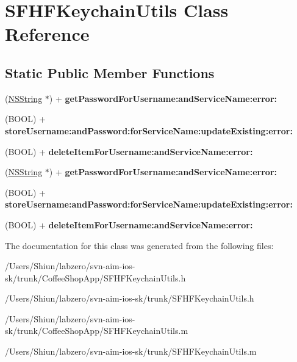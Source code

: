 \hypertarget{interface_s_f_h_f_keychain_utils}{
\section{SFHFKeychainUtils Class Reference}
\label{interface_s_f_h_f_keychain_utils}
}
\subsection*{Static Public Member Functions}
\begin{DoxyCompactItemize}
\item 
\hypertarget{interface_s_f_h_f_keychain_utils_a027d7dbf8da116cca940121559b57049}{
(\hyperlink{class_n_s_string}{NSString} $\ast$) + {\bfseries getPasswordForUsername:andServiceName:error:}}
\label{interface_s_f_h_f_keychain_utils_a027d7dbf8da116cca940121559b57049}

\item 
\hypertarget{interface_s_f_h_f_keychain_utils_afb7ef06a2b70b4f4c7db90728464a8d8}{
(BOOL) + {\bfseries storeUsername:andPassword:forServiceName:updateExisting:error:}}
\label{interface_s_f_h_f_keychain_utils_afb7ef06a2b70b4f4c7db90728464a8d8}

\item 
\hypertarget{interface_s_f_h_f_keychain_utils_aab8f59a643a261b8387f94a75cb8a616}{
(BOOL) + {\bfseries deleteItemForUsername:andServiceName:error:}}
\label{interface_s_f_h_f_keychain_utils_aab8f59a643a261b8387f94a75cb8a616}

\item 
\hypertarget{interface_s_f_h_f_keychain_utils_a027d7dbf8da116cca940121559b57049}{
(\hyperlink{class_n_s_string}{NSString} $\ast$) + {\bfseries getPasswordForUsername:andServiceName:error:}}
\label{interface_s_f_h_f_keychain_utils_a027d7dbf8da116cca940121559b57049}

\item 
\hypertarget{interface_s_f_h_f_keychain_utils_afb7ef06a2b70b4f4c7db90728464a8d8}{
(BOOL) + {\bfseries storeUsername:andPassword:forServiceName:updateExisting:error:}}
\label{interface_s_f_h_f_keychain_utils_afb7ef06a2b70b4f4c7db90728464a8d8}

\item 
\hypertarget{interface_s_f_h_f_keychain_utils_aab8f59a643a261b8387f94a75cb8a616}{
(BOOL) + {\bfseries deleteItemForUsername:andServiceName:error:}}
\label{interface_s_f_h_f_keychain_utils_aab8f59a643a261b8387f94a75cb8a616}

\end{DoxyCompactItemize}


The documentation for this class was generated from the following files:\begin{DoxyCompactItemize}
\item 
/Users/Shiun/labzero/svn-\/aim-\/ios-\/sk/trunk/CoffeeShopApp/SFHFKeychainUtils.h\item 
/Users/Shiun/labzero/svn-\/aim-\/ios-\/sk/trunk/SFHFKeychainUtils.h\item 
/Users/Shiun/labzero/svn-\/aim-\/ios-\/sk/trunk/CoffeeShopApp/SFHFKeychainUtils.m\item 
/Users/Shiun/labzero/svn-\/aim-\/ios-\/sk/trunk/SFHFKeychainUtils.m\end{DoxyCompactItemize}
